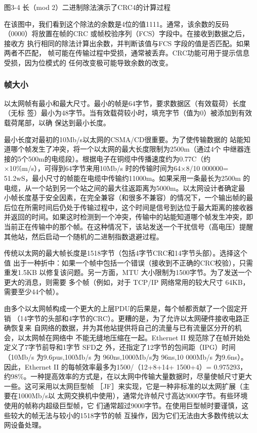 图3-4 长（mod 2）二进制除法演示了CRC4的计算过程

在该图中，我们看到这个除法的余数是4位的值1111。通常，该余数的反码
（0000）将放置在帧的CRC 或帧校验序列（FCS）字段中。在接收到数据之后，接收方
执行相同的除法计算出余数，并判断该值与FCS 字段的值是否匹配。如果两者不匹配，
帧可能在传输过程中受损，通常被丢弃。CRC功能可用于提示信息受损，因为位模式的
任何改变极可能导致余数的改变。

\subsubsection{帧大小}

以太网帧有最小和最大尺寸。最小的帧是64字节，要求数据区（有效载荷）长度（无标
签）最小为48字节。当有效载荷较小时，填充字节（值为0）被添加到有效载荷尾部，以确
保达到最小长度。

\begin{tcolorbox}
  最小长度对最初的10Mb/s以太网的CSMA/CD很重要。为了使传输数据的
  站能知道哪个帧发生了冲突，将一个以太网的最大长度限制为2500m（通过4个
  中继器连接的5个500m的电缆段）。根据电子在铜缆中传播速度约为0.77C（约
  ×10\%m/s），可得到64字节来用10Mb/s 时的传输时间为64×8/10 000000=
  51.2wS，最小尺寸的帧能在电缆中传输约11000m。如果采用一条最长为2500m
  的电缆，从一个站到另一个站之间的最大往返距离为5000m。以太网设计者确定最
  小帧长度基于安全因素，在完全兼容（和很多不兼容）的情况下，一个输出帧的最
  后位在所需时间后仍处于传输过程中，这个时间是信号到达位于最大距离的接收器
  并返回的时间。如果这时检测到一个冲突，传输中的站能知道哪个帧发生冲突，即
  当前正在传输中的那个帧。在这种情况下，该站发送一个干扰信号（高电压）提醒
  其他站，然后启动一个随机的二进制指数退避过程。
\end{tcolorbox}

传统以太网的最大帧长度是1518字节（包括4字节CRC和14字节头部）。选择这个值
出于一种折中：如果一个帧中包括一个错误（接收到不正确的CRC校验），只需重发1.5KB
以修复该问题。另一方面，MTU 大小限制为1500字节。为了发送一个更大的消息，则需要
多个帧（例如，对于 TCP/IP 网络常用的较大尺寸 64KB，需要至少44个帧）。

由多个以太网帧构成一个更大的上层PDU的后果是，每个帧都贡献了一个固定开销
（14字节的头部和4字节的CRC）。更糟的是，为了允许以太网硬件接收电路正确恢复来
自网络的数据，并为其他站提供将自己的流量与已有流量区分开的机会，以太网帧在网络中
不能无缝地压缩在一起。Ethernet II 规范除了在帧开始处定义了7字节前导和1字节 SFD之
外，还指定了12字节的包间距（IPG）时间（10Mb/s 为9.6pus,100Mb/s 为 960ns,1000Mb/s为
96ns,10 000Mb/s 为9.6ns）。因此，Ethernet II 的每帧效率最多为1500/（12+8+14+ 1500+4）=
0.975293，约98\%。一种提高效率的方式是，在以太网中传输大量数据时，尽量使帧尺寸更大
一些。这可采用以太网巨型帧 ［JF］来实现，它是一种非标准的以太网扩展（主要在1000Mb/s以
太网交换机中使用），通常允许帧尺寸高达9000字节。有些环境使用的帧称内超级巨型帧，它
们通常超过9000字节。在使用巨型帧时要谨慎，这些较大的帧无法与较小的1518字节的帧
互操作，因为它们无法由大多数传统以太网设备处理。

